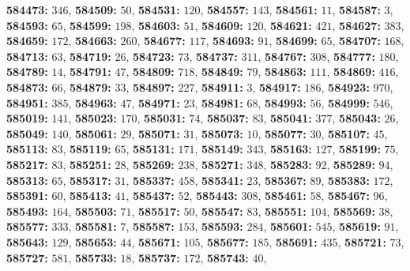 \textsf{\bfseries 584473:} $346$, \textsf{\bfseries 584509:} $50$, \textsf{\bfseries 584531:} $120$, \textsf{\bfseries 584557:} $143$, \textsf{\bfseries 584561:} $11$, \textsf{\bfseries 584587:} $3$, \textsf{\bfseries 584593:} $65$, \textsf{\bfseries 584599:} $198$, \textsf{\bfseries 584603:} $51$, \textsf{\bfseries 584609:} $120$, \textsf{\bfseries 584621:} $421$, \textsf{\bfseries 584627:} $383$, \textsf{\bfseries 584659:} $172$, \textsf{\bfseries 584663:} $260$, \textsf{\bfseries 584677:} $117$, \textsf{\bfseries 584693:} $91$, \textsf{\bfseries 584699:} $65$, \textsf{\bfseries 584707:} $168$, \textsf{\bfseries 584713:} $63$, \textsf{\bfseries 584719:} $26$, \textsf{\bfseries 584723:} $73$, \textsf{\bfseries 584737:} $311$, \textsf{\bfseries 584767:} $308$, \textsf{\bfseries 584777:} $180$, \textsf{\bfseries 584789:} $14$, \textsf{\bfseries 584791:} $47$, \textsf{\bfseries 584809:} $718$, \textsf{\bfseries 584849:} $79$, \textsf{\bfseries 584863:} $111$, \textsf{\bfseries 584869:} $416$, \textsf{\bfseries 584873:} $66$, \textsf{\bfseries 584879:} $33$, \textsf{\bfseries 584897:} $227$, \textsf{\bfseries 584911:} $3$, \textsf{\bfseries 584917:} $186$, \textsf{\bfseries 584923:} $970$, \textsf{\bfseries 584951:} $385$, \textsf{\bfseries 584963:} $47$, \textsf{\bfseries 584971:} $23$, \textsf{\bfseries 584981:} $68$, \textsf{\bfseries 584993:} $56$, \textsf{\bfseries 584999:} $546$, \textsf{\bfseries 585019:} $141$, \textsf{\bfseries 585023:} $170$, \textsf{\bfseries 585031:} $74$, \textsf{\bfseries 585037:} $83$, \textsf{\bfseries 585041:} $377$, \textsf{\bfseries 585043:} $26$, \textsf{\bfseries 585049:} $140$, \textsf{\bfseries 585061:} $29$, \textsf{\bfseries 585071:} $31$, \textsf{\bfseries 585073:} $10$, \textsf{\bfseries 585077:} $30$, \textsf{\bfseries 585107:} $45$, \textsf{\bfseries 585113:} $83$, \textsf{\bfseries 585119:} $65$, \textsf{\bfseries 585131:} $171$, \textsf{\bfseries 585149:} $343$, \textsf{\bfseries 585163:} $127$, \textsf{\bfseries 585199:} $75$, \textsf{\bfseries 585217:} $83$, \textsf{\bfseries 585251:} $28$, \textsf{\bfseries 585269:} $238$, \textsf{\bfseries 585271:} $348$, \textsf{\bfseries 585283:} $92$, \textsf{\bfseries 585289:} $94$, \textsf{\bfseries 585313:} $65$, \textsf{\bfseries 585317:} $31$, \textsf{\bfseries 585337:} $458$, \textsf{\bfseries 585341:} $23$, \textsf{\bfseries 585367:} $89$, \textsf{\bfseries 585383:} $172$, \textsf{\bfseries 585391:} $60$, \textsf{\bfseries 585413:} $41$, \textsf{\bfseries 585437:} $52$, \textsf{\bfseries 585443:} $308$, \textsf{\bfseries 585461:} $58$, \textsf{\bfseries 585467:} $96$, \textsf{\bfseries 585493:} $164$, \textsf{\bfseries 585503:} $71$, \textsf{\bfseries 585517:} $50$, \textsf{\bfseries 585547:} $83$, \textsf{\bfseries 585551:} $104$, \textsf{\bfseries 585569:} $38$, \textsf{\bfseries 585577:} $333$, \textsf{\bfseries 585581:} $7$, \textsf{\bfseries 585587:} $153$, \textsf{\bfseries 585593:} $284$, \textsf{\bfseries 585601:} $545$, \textsf{\bfseries 585619:} $91$, \textsf{\bfseries 585643:} $129$, \textsf{\bfseries 585653:} $44$, \textsf{\bfseries 585671:} $105$, \textsf{\bfseries 585677:} $185$, \textsf{\bfseries 585691:} $435$, \textsf{\bfseries 585721:} $73$, \textsf{\bfseries 585727:} $581$, \textsf{\bfseries 585733:} $18$, \textsf{\bfseries 585737:} $172$, \textsf{\bfseries 585743:} $40$, 
